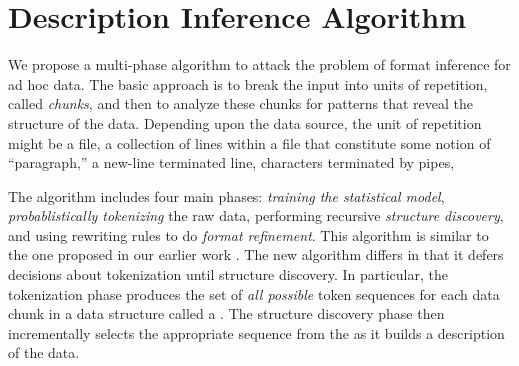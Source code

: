 
\section{Description Inference Algorithm}\label{sec:algo}

We propose a multi-phase algorithm to attack the problem of
format inference for ad hoc data. The basic approach is to break the
input into units of repetition, called {\em chunks}, and then to
analyze these chunks for patterns that reveal the structure
of the data.  Depending upon the data source, the unit of repetition
might be a file, a collection of lines within a file that constitute
some notion of ``paragraph,'' a new-line terminated line, characters
terminated by pipes, \etc{}

The algorithm includes four main phases:
{\em training the statistical model}, 
{\em probablistically tokenizing} the raw data, 
performing recursive {\em structure discovery},
and using rewriting rules to do {\em format refinement}. 
This algorithm is similar to the one proposed in our earlier work
\cite{fisher+:dirttoshovels}.  
The new algorithm differs in that it defers decisions about
tokenization until structure discovery. 
In particular, the tokenization phase produces the set of {\em all
possible} token sequences for each data chunk in a data structure
called a \seqset{}.  The structure
discovery phase then incrementally selects the appropriate sequence from
the \seqset{} as it builds a description of the data.



